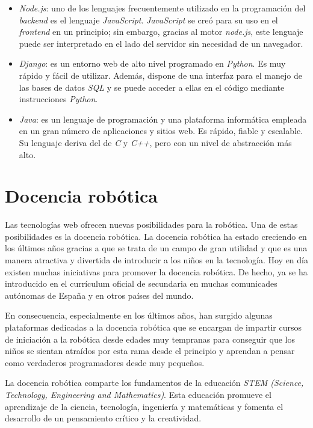 \begin{itemize}
    \item \textit{Node.js}: uno de los lenguajes frecuentemente utilizado en la programación del \textit{backend} es el lenguaje \textit{JavaScript}. \textit{JavaScript} se creó para su uso en el \textit{frontend} en un principio; sin embargo, gracias al motor \textit{node.js}, este lenguaje puede ser interpretado en el lado del servidor sin necesidad de un navegador.
    \item \textit{Django}: es un entorno web de alto nivel programado en \textit{Python}. Es muy rápido y fácil de utilizar. Además, dispone de una interfaz para el manejo de las bases de datos \textit{SQL} y se puede acceder a ellas en el código mediante instrucciones \textit{Python}.
    \item \textit{Java}: es un lenguaje de programación y una plataforma informática empleada en un gran número de aplicaciones y sitios web. Es rápido, fiable y escalable. Su lenguaje deriva del de \textit{C} y \textit{C++}, pero con un nivel de abstracción más alto.
\end{itemize}


\section{Docencia robótica}
Las tecnologías web ofrecen nuevas posibilidades para la robótica. Una de estas posibilidades es la docencia robótica. La docencia robótica ha estado creciendo en los últimos años gracias a que se trata de un campo de gran utilidad y que es una manera atractiva y divertida de introducir a los niños en la tecnología. Hoy en día existen muchas iniciativas para promover la docencia robótica. De hecho, ya se ha introducido en el currículum oficial de secundaria en muchas comunicades autónomas de España y en otros países del mundo.  \newline

En consecuencia, especialmente en los últimos años, han surgido algunas plataformas dedicadas a la docencia robótica que se encargan de impartir cursos de iniciación a la robótica desde edades muy tempranas para conseguir que los niños se sientan atraídos por esta rama desde el principio y aprendan a pensar como verdaderos programadores desde muy pequeños. \newline

La docencia robótica comparte los fundamentos de la educación \textit{STEM (Science, Technology, Engineering and Mathematics)}. Esta educación promueve el aprendizaje de la ciencia, tecnología, ingeniería y matemáticas y fomenta el desarrollo de un pensamiento crítico y la creatividad. \newline

